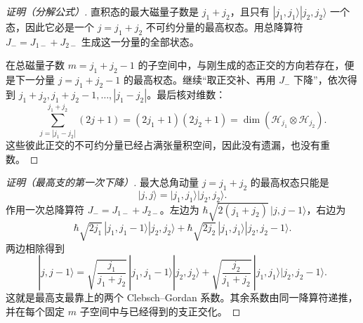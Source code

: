 \begin{proof}[证明（分解公式）]
直积态的最大磁量子数是 \(j_1+j_2\)，且只有
\(|j_1,j_1\rangle|j_2,j_2\rangle\) 一个态，因此它必是一个
\(j=j_1+j_2\) 不可约分量的最高权态。用总降算符
\(J_-=J_{1-}+J_{2-}\) 生成这一分量的全部状态。

在总磁量子数 \(m=j_1+j_2-1\) 的子空间中，与刚生成的态正交的方向若存在，便是下一分量 \(j=j_1+j_2-1\) 的最高权态。继续“取正交补、再用 \(J_-\) 下降”，依次得到
\(j_1+j_2,j_1+j_2-1,\ldots,|j_1-j_2|\)。最后核对维数：
\[
\sum_{j=|j_1-j_2|}^{j_1+j_2}(2j+1)
=(2j_1+1)(2j_2+1)
=\dim(\mathcal H_{j_1}\otimes\mathcal H_{j_2}).
\]
这些彼此正交的不可约分量已经占满张量积空间，因此没有遗漏，也没有重数。
\end{proof}

\begin{proof}[证明（最高支的第一次下降）]
最大总角动量 \(j=j_1+j_2\) 的最高权态只能是
\[
|j,j\rangle=|j_1,j_1\rangle|j_2,j_2\rangle.
\]
作用一次总降算符 \(J_-=J_{1-}+J_{2-}\)。左边为
\(\hbar\sqrt{2(j_1+j_2)}\,|j,j-1\rangle\)，右边为
\[
\hbar\sqrt{2j_1}\,
|j_1,j_1-1\rangle|j_2,j_2\rangle
+\hbar\sqrt{2j_2}\,
|j_1,j_1\rangle|j_2,j_2-1\rangle .
\]
两边相除得到
\[
|j,j-1\rangle
=\sqrt{\frac{j_1}{j_1+j_2}}\,
|j_1,j_1-1\rangle|j_2,j_2\rangle
+\sqrt{\frac{j_2}{j_1+j_2}}\,
|j_1,j_1\rangle|j_2,j_2-1\rangle .
\]
这就是最高支最靠上的两个 Clebsch--Gordan 系数。其余系数由同一降算符递推，并在每个固定 \(m\) 子空间中与已经得到的支正交化。
\end{proof}

